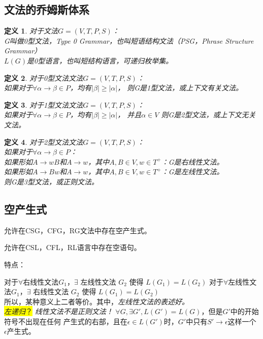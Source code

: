 \documentclass{ctexart}
\newcommand{\hl}[1]{\colorbox{yellow}{#1}}
\newtheorem{definition}{定义}[section]
\begin{document}
\subsection{文法的乔姆斯体系}
\begin{definition}
    对于文法$G = (V,T,P,S)$： \\
    G叫做0型文法，Type 0 Grammar，也叫短语结构文法（PSG，Phrase Structure Grammar） \\
    $L(G)$是0型语言，也叫短结构语言，可递归枚举集。
\end{definition}
\begin{definition}
    对于0型文法文法$G = (V,T,P,S)$： \\
    如果对于$\forall \alpha \to \beta \in P$，均有$|\beta| \geq |\alpha|$，
    则G是1型文法，或上下文有关文法。
\end{definition}
\begin{definition}
    对于1型文法文法$G = (V,T,P,S)$： \\
    如果对于$\forall \alpha \to \beta \in P$，均有$|\beta| \geq |\alpha|$，
    并且$\alpha \in V$
    则G是2型文法，或上下文无关文法。
\end{definition}
\begin{definition}
    对于2型文法文法$G = (V,T,P,S)$： \\
    如果对于$\forall \alpha \to \beta \in P$： \\
    如果形如$A \to wB$和$A \to w$，其中$A,B \in V, w \in T^+$：G是右线性文法。 \\
    如果形如$A \to Bw$和$A \to w$，其中$A,B \in V, w \in T^+$：G是左线性文法。 \\
    则G是3型文法，或正则文法。
\end{definition}

\subsection{空产生式}
允许在CSG，CFG，RG文法中存在空产生式。 

允许在CSL，CFL，RL语言中存在空语句。

特点：
\begin{outline}
    \1 对于$\forall$右线性文法$G_1$，$\exists$ 左线性文法 $G_2$ 使得 
    $L(G_1) = L(G_2)$
    \1 对于$\forall$左线性文法$G_1$，$\exists$ 右线性文法 $G_2$ 使得 
    $L(G_1) = L(G_2)$ \\
        所以，某种意义上二者等价。其中，\emph{左线性文法的表述好。}\\
        \hl{\emph{左递归}？}
        \emph{线性文法不是正则文法！}
    \1 $\forall G, \exists G', L(G') = L(G)$，但是$G'$中的开始符号不出现在任何
    产生式的右部，且在$\epsilon \in L(G')$时，$G'$中只有$S' \to \epsilon$这样一个
    $\epsilon$产生式。
\end{outline}
\end{document}
